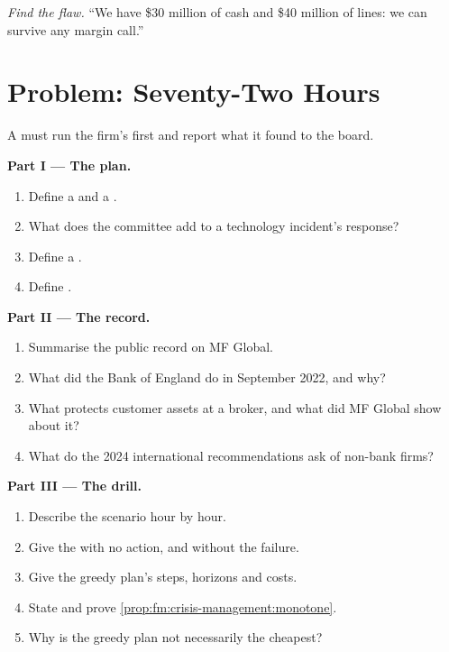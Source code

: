 \begin{exercise}[$\star\star\star$]\label{exo:fm:crisis-management:8}
\emph{Find the flaw.} ``We have \$30 million of cash and \$40 million of lines: we can survive any margin call.''
\end{exercise}

\section{Problem: Seventy-Two Hours}

\begin{problem}\label{pb:fm:crisis-management:1}
A  must run the firm's first  and report what it found to the board.

\medskip\noindent\textbf{Part I --- The plan.}
\begin{enumerate}
\item Define a  and a .
\item What does the committee add to a technology incident's response?
\item Define a .
\item Define .
\end{enumerate}

\medskip\noindent\textbf{Part II --- The record.}
\begin{enumerate}[resume]
\item Summarise the public record on MF Global.
\item What did the Bank of England do in September 2022, and why?
\item What protects customer assets at a broker, and what did MF Global show about it?
\item What do the 2024 international recommendations ask of non-bank firms?
\end{enumerate}

\medskip\noindent\textbf{Part III --- The drill.}
\begin{enumerate}[resume]
\item Describe the scenario hour by hour.
\item Give the  with no action, and without the failure.
\item Give the greedy plan's steps, horizons and costs.
\item State and prove \cref{prop:fm:crisis-management:monotone}.
\item Why is the greedy plan not necessarily the cheapest?
\end{enumerate}


\end{problem}
